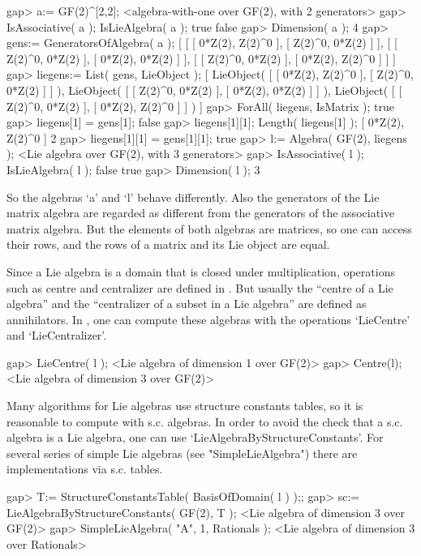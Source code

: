 \beginexample
    gap> a:= GF(2)^[2,2];
    <algebra-with-one over GF(2), with 2 generators>
    gap> IsAssociative( a ); IsLieAlgebra( a );
    true
    false
    gap> Dimension( a );
    4
    gap> gens:= GeneratorsOfAlgebra( a );
    [ [ [ 0*Z(2), Z(2)^0 ], [ Z(2)^0, 0*Z(2) ] ], 
      [ [ Z(2)^0, 0*Z(2) ], [ 0*Z(2), 0*Z(2) ] ], 
      [ [ Z(2)^0, 0*Z(2) ], [ 0*Z(2), Z(2)^0 ] ] ]
    gap> liegens:= List( gens, LieObject );
    [ LieObject( [ [ 0*Z(2), Z(2)^0 ], [ Z(2)^0, 0*Z(2) ] ] ), 
      LieObject( [ [ Z(2)^0, 0*Z(2) ], [ 0*Z(2), 0*Z(2) ] ] ), 
      LieObject( [ [ Z(2)^0, 0*Z(2) ], [ 0*Z(2), Z(2)^0 ] ] ) ]
    gap> ForAll( liegens, IsMatrix );
    true
    gap> liegens[1] = gens[1];
    false
    gap> liegens[1][1]; Length( liegens[1] );
    [ 0*Z(2), Z(2)^0 ]
    2
    gap> liegens[1][1] = gens[1][1];
    true
    gap> l:= Algebra( GF(2), liegens );
    <Lie algebra over GF(2), with 3 generators>
    gap> IsAssociative( l ); IsLieAlgebra( l );
    false
    true
    gap> Dimension( l );
    3
\endexample

So the algebras `a' and `l' behave differently.
Also the generators of the Lie matrix algebra are regarded as
different from the generators of the associative matrix algebra.
But the elements of both algebras are matrices, so one can access
their rows, and the rows of a matrix and its Lie object are equal.

Since a Lie algebra is a domain that is closed under multiplication,
operations such as centre and centralizer are defined in {\GAP}.
But usually the ``centre of a Lie algebra'' and the ``centralizer of a
subset in a Lie algebra'' are defined as annihilators.
In {\GAP}, one can compute these algebras with the operations `LieCentre'
and `LieCentralizer'.

\beginexample
    gap> LieCentre( l );
    <Lie algebra of dimension 1 over GF(2)>
    gap> Centre(l);
    <Lie algebra of dimension 3 over GF(2)>
\endexample

Many algorithms for Lie algebras use structure constants tables,
so it is reasonable to compute with s.c. algebras.
In order to avoid the check that a s.c. algebra is a Lie algebra,
one can use `LieAlgebraByStructureConstants'.
For several series of simple Lie algebras (see "SimpleLieAlgebra")
there are implementations via s.c. tables.

\beginexample
    gap> T:= StructureConstantsTable( BasisOfDomain( l ) );;
    gap> sc:= LieAlgebraByStructureConstants( GF(2), T );
    <Lie algebra of dimension 3 over GF(2)>
    gap> SimpleLieAlgebra( "A", 1, Rationals );
    <Lie algebra of dimension 3 over Rationals>
\endexample

